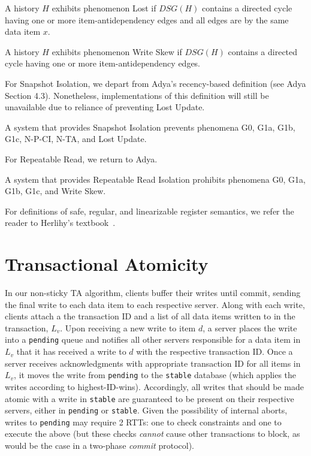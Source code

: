 \begin{definition}
A history $H$ exhibits phenomenon Lost if $DSG(H)$ contains a directed
cycle having one or more item-antidependency edges and all edges are
by the same data item $x$.
\label{def:lostupdate}
\end{definition}

\begin{definition}
A history $H$ exhibits phenomenon Write Skew if $DSG(H)$ contains a directed
cycle having one or more item-antidependency edges.
\end{definition}

For Snapshot Isolation, we depart from Adya's recency-based definition
(see Adya Section 4.3). Nonetheless, implementations of this
definition will still be unavailable due to reliance of preventing
Lost Update.

\begin{definition}
A system that provides Snapshot Isolation prevents phenomena G0, G1a,
G1b, G1c, N-P-CI, N-TA, and Lost Update.
\end{definition}

For Repeatable Read, we return to Adya.

\begin{definition}
A system that provides Repeatable Read Isolation prohibits phenomena
G0, G1a, G1b, G1c, and Write Skew.
\end{definition}

For definitions of safe, regular, and linearizable register semantics,
we refer the reader to Herlihy's textbook~\cite{herlihy-art}.

\section{Transactional Atomicity}

In our non-sticky TA algorithm, clients buffer their writes until
commit, sending the final write to each data item to each respective
server. Along with each write, clients attach a the transaction ID and
a list of all data items written to in the transaction, $L_v$. Upon
receiving a new write to item $d$, a server places the write into a
\texttt{pending} queue and notifies all other servers responsible for
a data item in $L_v$ that it has received a write to $d$ with the
respective transaction ID. Once a server receives acknowledgments with
appropriate transaction ID for all items in $L_v$, it moves the write
from \texttt{pending} to the \texttt{stable} database (which applies
the writes according to highest-ID-wins). Accordingly, all writes that
should be made atomic with a write in \texttt{stable} are guaranteed
to be present on their respective servers, either in \texttt{pending}
or \texttt{stable}. Given the possibility of internal aborts, writes
to \texttt{pending} may require 2 RTTs: one to check constraints and
one to execute the above (but these checks \textit{cannot} cause other
transactions to block, as would be the case in a two-phase
\textit{commit} protocol).

